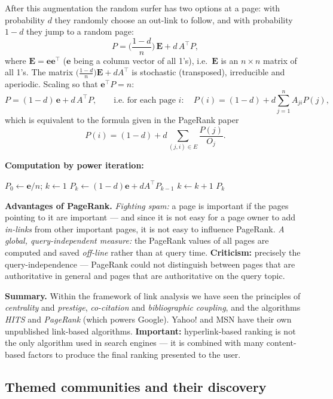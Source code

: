 \documentclass[11pt,a4paper]{article}
\theoremstyle{definition}
\begin{document}
\begin{defbox}
After this augmentation the random surfer has two options at a page: with probability $d$ they
randomly choose an out-link to follow, and with probability $1-d$ they jump to a random page:
\[ P=\Big(\frac{1-d}{n}\Big)\,\mathbf{E}+d\,A^{\!\top}P, \]
where $\mathbf E=\mathbf{ee}^{\!\top}$ ($\mathbf e$ being a column vector of all 1's), i.e.\
$\mathbf E$ is an $n\times n$ matrix of all 1's. The matrix
$\big(\frac{1-d}{n}\big)\mathbf E+dA^{\!\top}$ is stochastic (transposed), irreducible and
aperiodic. Scaling so that $\mathbf e^{\!\top}P=n$:
\[ P=(1-d)\,\mathbf e+d\,A^{\!\top}P,\qquad\text{i.e.\ for each page } i: \quad
   P(i)=(1-d)+d\sum_{j=1}^{n}A_{ji}P(j), \]
which is equivalent to the formula given in the PageRank paper
\[ P(i)=(1-d)+d\sum_{(j,i)\in E}\frac{P(j)}{O_j}. \]

\textbf{Computation by power iteration:}
\begin{algorithmic}[1]
\State $P_0\gets \mathbf e/n$; $k\gets 1$
\Repeat
  \State $P_k\gets (1-d)\mathbf e+dA^{\!\top}P_{k-1}$
  \State $k\gets k+1$
\State \Return $P_k$
\end{algorithmic}
\end{defbox}

\textbf{Advantages of PageRank.} \emph{Fighting spam:} a page is important if the pages pointing to it
are important --- and since it is not easy for a page owner to add \emph{in-links} from other
important pages, it is not easy to influence PageRank. \emph{A global, query-independent measure:} the
PageRank values of all pages are computed and saved \emph{off-line} rather than at query time.
\textbf{Criticism:} precisely the query-independence --- PageRank could not distinguish between pages
that are authoritative in general and pages that are authoritative on the query topic.

\textbf{Summary.} Within the framework of link analysis we have seen the principles of
\emph{centrality} and \emph{prestige}, \emph{co-citation} and \emph{bibliographic coupling}, and the
algorithms \emph{HITS} and \emph{PageRank} (which powers Google). Yahoo! and MSN have their own
unpublished link-based algorithms. \textbf{Important:} hyperlink-based ranking is not the only
algorithm used in search engines --- it is combined with many content-based factors to produce the
final ranking presented to the user.

\subsection{Themed communities and their discovery}
\end{document}
